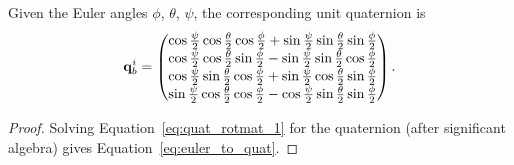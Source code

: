 \begin{lemma} \label{euler_to_quat}
Given the Euler angles $\phi$, $\theta$, $\psi$, the corresponding unit quaternion is
\begin{equation}\label{eq:euler_to_quat}
\qbf_b^i = \begin{pmatrix}
	\cos\frac{\psi}{2}\cos\frac{\theta}{2}\cos\frac{\phi}{2}+\sin\frac{\psi}{2}\sin\frac{\theta}{2}\sin\frac{\phi}{2} \\
	\cos\frac{\psi}{2}\cos\frac{\theta}{2}\sin\frac{\phi}{2}-\sin\frac{\psi}{2}\sin\frac{\theta}{2}\cos\frac{\phi}{2} \\
	\cos\frac{\psi}{2}\sin\frac{\theta}{2}\cos\frac{\phi}{2}+\sin\frac{\psi}{2}\cos\frac{\theta}{2}\sin\frac{\phi}{2} \\
	\sin\frac{\psi}{2}\cos\frac{\theta}{2}\cos\frac{\phi}{2}-\cos\frac{\psi}{2}\sin\frac{\theta}{2}\sin\frac{\phi}{2}	
\end{pmatrix}.
\end{equation}
\end{lemma}
\begin{proof}
Solving Equation~\eqref{eq:quat_rotmat_1} for the quaternion (after significant algebra) gives Equation~\eqref{eq:euler_to_quat}.
\end{proof}

